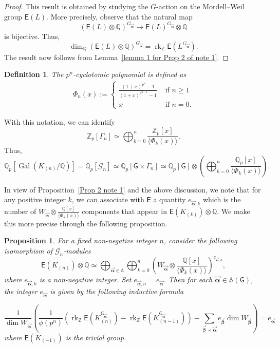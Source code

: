 \documentclass{amsart}
\newcommand{\edit}[1]{\textcolor{black}{#1}}
\newtheorem{proposition}[theorem]{Proposition}
\newtheorem{definition}[theorem]{Definition}
\numberwithin{equation}{section}
\theoremstyle{remark}
\newcommand{\val}{\vec{\boldsymbol{\alpha}}}
\newcommand{\rk}{\operatorname{rk}}
\newcommand{\EC}{\mathsf{E}}
\newcommand{\cG}{\mathcal{G}}
\newcommand{\Gal}{\operatorname{Gal}}
\newcommand{\Qp}{\mathbb{Q}_p}
\newcommand{\sG}{\mathsf{G}}
\newcommand{\Zp}{\mathbb{Z}_p}
\newcommand{\Z}{\mathbb{Z}}
\newcommand{\A}{\mathbb{A}}
\newcommand{\Q}{\mathbb{Q}}
\theoremstyle{plain} %
\begin{document}
\begin{proof}
This result is obtained by studying the $G$-action on the Mordell--Weil group $\EC(L)$.
More precisely, observe that the natural map
\[
\left( \EC(L) \otimes \Q\right)^{G_{\val}} \longrightarrow \EC(L)^{G_{\val}} \otimes \Q
\]
is bijective.
Thus,
\[
\dim_{\Q}\left( \EC(L) \otimes \Q\right)^{G_{\val}} = \rk_{\Z} \EC(L^{G_{\val}}).
\]
The result now follows from Lemma~\ref{lemma 1 for Prop 2 of note 1}.
\end{proof}



\begin{definition}
The \emph{$p^n$-cyclotomic polynomial} is defined as
\begin{align*}
\Phi_n(x) := 
\begin{cases}
\frac{(1+x)^{p^n} - 1}{(1+x)^{p^{n-1}} - 1} & \text{ if } n\geq 1\\
x & \text{ if } n=0.
\end{cases}
\end{align*}    
\end{definition}

With this notation, we can identify
\[
\Zp[\Gamma_n] \simeq \bigoplus_{k=0}^n \frac{\Zp[x]}{\langle \Phi_k(x)\rangle}.
\]
Thus,
\[
\Qp[\Gal(K_{(n)}/\Q)] = \Qp[\cG_n] \simeq \Qp[\sG \times \Gamma_n] \simeq \Qp[\sG]\otimes \left(\bigoplus_{k=0}^n\frac{\Qp[x]}{\langle \Phi_k(x)\rangle}\right).
\]

In view of Proposition~\ref{Prop 2 note 1} and the above discussion, we note that for any positive integer $k$, we can associate \edit{with $\EC$} a quantity $e_{\val,k}$ which is the number of $W_{\val} \otimes \frac{\Q[x]}{\langle \Phi_k(x)\rangle}$ components that appear in $\EC(K_{(k)}) \otimes \Q$.
We make this more precise through the following proposition.

\begin{proposition}
\label{main result from note clarifying remark}
For a fixed non\edit{-}negative integer $n$, consider the following isomorphism of $\mathcal{G}_n$-modules
\begin{equation}
\label{eq: isomorphism to answer ref}
\EC(K_{(n)}) \otimes \Q \simeq \bigoplus_{\val\in \A} \bigoplus_{k=0}^n \left( W_{\val} \otimes \frac{\Q[x]}{\langle \Phi_k(x)\rangle} \right)^{e_{\val,k}},
\end{equation}
where $e_{\val,k}$ is a non-negative integer.
Set $e_{\val,n}= e_{\val}$\edit{.} 
Then for each $\val\in \A(\sG)$, the integer $e_{\val}$ is given by the following inductive formula

\[
\frac{1}{\dim W_{\val}}\left(\frac{1}{\phi(p^n)}\left( \rk_{\Z}\EC(K_{(n)}^{\sG_{\val}}) - \rk_{\Z}\EC(K_{(n-1)}^{\sG_{\val}}) \right) - \sum_{\vec{\boldsymbol{\beta}} \prec \val} e_{\vec{\boldsymbol{\beta}}}\dim W_{\vec{\boldsymbol{\beta}}} \right)= e_{\val}
\]
where $\EC(K_{(-1)})$ is the trivial group.
\end{proposition}
\end{document}
